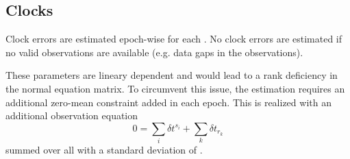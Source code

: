 \subsection{Clocks}\label{gnssParametrizationType:clocks}
Clock errors are estimated epoch-wise for each .
No clock errors are estimated if no valid observations are available (e.g. data gaps in the observations).

These parameters are lineary dependent and would lead to a rank deficiency in the normal equation
matrix. To circumvent this issue, the estimation requires an additional zero-mean constraint added in each epoch.
This is realized with an additional observation equation
\begin{equation}
 0 = \sum_i \delta t^{s_i} + \sum_k \delta t_{r_k}
\end{equation}
summed over all 
with a standard deviation of .


